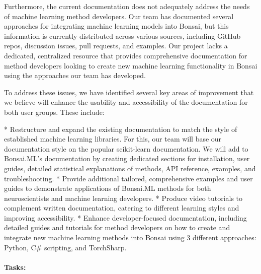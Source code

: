 Furthermore, the current documentation does not adequately address the needs of machine learning method developers. Our team has documented several approaches for integrating machine learning models into Bonsai, but this information is currently distributed across various sources, including GitHub repos, discussion issues, pull requests, and examples. Our project lacks a dedicated, centralized resource that provides comprehensive documentation for method developers looking to create new machine learning functionality in Bonsai using the approaches our team has developed.

To address these issues, we have identified several key areas of improvement that we believe will enhance the usability and accessibility of the documentation for both user groups. These include:

* Restructure and expand the existing documentation to match the style of established machine learning libraries. For this, our team will base our documentation style on the popular scikit-learn documentation. We will add to Bonsai.ML's documentation by creating dedicated sections for installation, user guides, detailed statistical explanations of methods, API reference, examples, and troubleshooting.
* Provide additional tailored, comprehensive examples and user guides to demonstrate applications of Bonsai.ML methods for both neuroscientists and machine learning developers.
* Produce video tutorials to complement written documentation, catering to different learning styles and improving accessibility.
* Enhance developer-focused documentation, including detailed guides and tutorials for method developers on how to create and integrate new machine learning methods into Bonsai using 3 different approaches: Python, C\# scripting, and TorchSharp.


\paragraph{Tasks:}\mbox{}\\

